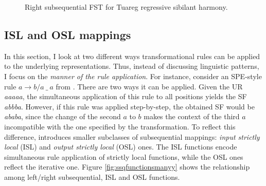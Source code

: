 \begin{figure}[h!] 
\centering
{}
\caption{Right subsequential FST for Tuareg regressive sibilant harmony.}
\label{ksgjkjgsk}
\end{figure}







\subsection{ISL and OSL mappings}

In this section, I look at two different ways transformational rules can be applied to the underlying representations.
Thus, instead of discussing linguistic patterns, I focus on the \emph{manner of the rule application}.
For instance, consider an SPE-style rule $a \rightarrow b / a~ \_~ a$ from \citep{Chandlee2014}.
There are two ways it can be applied.
Given the UR \emph{aaaaa}, the simultaneous application of this rule to all positions yields the SF \emph{abbba}.
However, if this rule was applied step-by-step, the obtained SF would be \emph{ababa}, since the change of the second $a$ to $b$ makes the context of the third $a$ incompatible with the one specified by the transformation.
To reflect this difference, \cite{Chandlee2014} introduces smaller subclasses of subsequential mappings: \emph{input strictly local} (ISL) and \emph{output strictly local} (OSL) ones.
The ISL functions encode simultaneous rule application of strictly local functions, while the OSL ones reflect the iterative one.
Figure \ref{fig:ssqfunctionsmanyy} shows the relationship among left/right subsequential, ISL and OSL functions.


